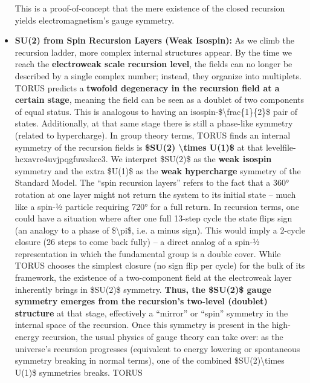 \documentclass[
]{article}
\begin{document}
\begin{itemize}
  This is a proof-of-concept that the mere existence of the closed
  recursion yields electromagnetism's gauge symmetry.
\item
  \textbf{SU(2) from Spin Recursion Layers (Weak Isospin):} As we climb
  the recursion ladder, more complex internal structures appear. By the
  time we reach the \textbf{electroweak scale recursion level}, the
  fields can no longer be described by a single complex number; instead,
  they organize into multiplets. TORUS predicts a \textbf{twofold
  degeneracy in the recursion field at a certain stage}, meaning the
  field can be seen as a doublet of two components of equal
  status\hspace{0pt}. This is analogous to having an
  isospin-\$\textbackslash frac\{1\}\{2\}\$ pair of states.
  Additionally, at that same stage there is still a phase-like symmetry
  (related to hypercharge). In group theory terms, TORUS finds an
  internal symmetry of the recursion fields is \textbf{\$SU(2)
  \textbackslash times U(1)\$} at that
  level\hspace{0pt}file-hcxavre4uvjpqgfuwskcc3. We interpret \$SU(2)\$
  as the \textbf{weak isospin} symmetry and the extra \$U(1)\$ as the
  \textbf{weak hypercharge} symmetry of the Standard Model. The ``spin
  recursion layers'' refers to the fact that a 360° rotation at one
  layer might not return the system to its initial state -- much like a
  spin-½ particle requiring 720° for a full return. In recursion terms,
  one could have a situation where after one full 13-step cycle the
  state flips sign (an analogy to a phase of \$\textbackslash pi\$, i.e.
  a minus sign)\hspace{0pt}. This would imply a 2-cycle closure (26
  steps to come back fully) -- a direct analog of a spin-½
  representation in which the fundamental group is a double cover. While
  TORUS chooses the simplest closure (no sign flip per cycle) for the
  bulk of its framework, the existence of a two-component field at the
  electroweak layer inherently brings in \$SU(2)\$ symmetry.
  \textbf{Thus, the \$SU(2)\$ gauge symmetry emerges from the
  recursion's two-level (doublet) structure} at that stage, effectively
  a ``mirror'' or ``spin'' symmetry in the internal space of the
  recursion\hspace{0pt}. Once this symmetry is present in the
  high-energy recursion, the usual physics of gauge theory can take
  over: as the universe's recursion progresses (equivalent to energy
  lowering or spontaneous symmetry breaking in normal terms), one of the
  combined \$SU(2)\textbackslash times U(1)\$ symmetries breaks. TORUS

\end{itemize}
\end{document}
